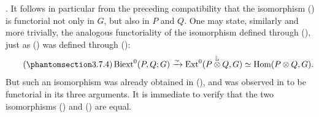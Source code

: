 . It follows in particular from the preceding compatibility
that the isomorphism () is functorial not only in $G$, but also
in $P$ and $Q$.  One may state, similarly and more trivially, the
analogous functoriality of the isomorphism defined through (),
just as () was defined through ():
\begin{equation}\tag{\SGARefTarget{sga7.sga7i.evii.n3-7-4}{3.7.4}}
 \Biext^0(P,Q;G)
 \xrightarrow{\sim}
 \Ext^0(P\mathbin{\overset{\mathbb L}{\otimes}}Q,G)
 \simeq\Hom(P\otimes Q,G).
\end{equation}
But such an isomorphism was already obtained in (), and was
observed in  to be functorial in its three arguments.  It is
immediate to verify that the two isomorphisms () and ()
are equal.

